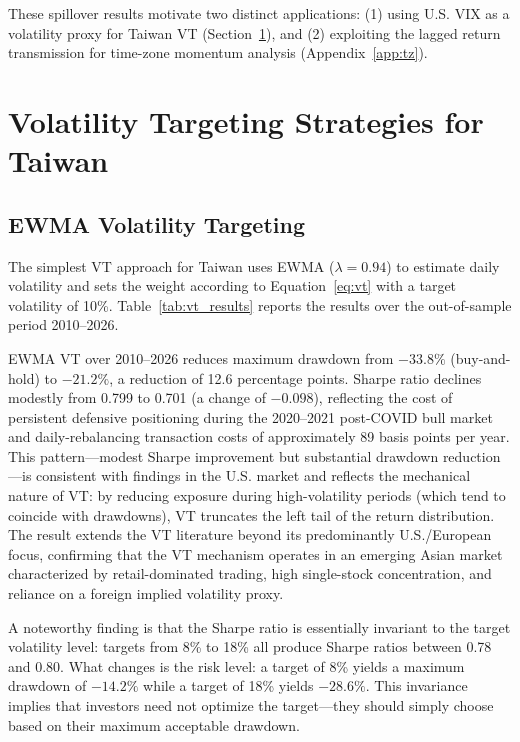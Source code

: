 These spillover results motivate two distinct applications: (1) using U.S. VIX as a volatility proxy for Taiwan VT (Section~\ref{sec:vt}), and (2) exploiting the lagged return transmission for time-zone momentum analysis (Appendix~\ref{app:tz}).



\section{Volatility Targeting Strategies for Taiwan}
\label{sec:vt}

\subsection{EWMA Volatility Targeting}

The simplest VT approach for Taiwan uses EWMA ($\lambda = 0.94$) to estimate daily volatility and sets the weight according to Equation~\eqref{eq:vt} with a target volatility of 10\%. Table~\ref{tab:vt_results} reports the results over the out-of-sample period 2010--2026.

EWMA VT over 2010--2026 reduces maximum drawdown from $-33.8\%$ (buy-and-hold) to $-21.2\%$, a reduction of 12.6 percentage points. Sharpe ratio declines modestly from 0.799 to 0.701 (a change of $-0.098$), reflecting the cost of persistent defensive positioning during the 2020--2021 post-COVID bull market and daily-rebalancing transaction costs of approximately 89 basis points per year. This pattern---modest Sharpe improvement but substantial drawdown reduction---is consistent with findings in the U.S. market \citep{moreira2017,harvey2018} and reflects the mechanical nature of VT: by reducing exposure during high-volatility periods (which tend to coincide with drawdowns), VT truncates the left tail of the return distribution. The result extends the VT literature beyond its predominantly U.S./European focus, confirming that the VT mechanism operates in an emerging Asian market characterized by retail-dominated trading, high single-stock concentration, and reliance on a foreign implied volatility proxy.

A noteworthy finding is that the Sharpe ratio is essentially invariant to the target volatility level: targets from 8\% to 18\% all produce Sharpe ratios between 0.78 and 0.80. What changes is the risk level: a target of 8\% yields a maximum drawdown of $-14.2\%$ while a target of 18\% yields $-28.6\%$. This invariance implies that investors need not optimize the target---they should simply choose based on their maximum acceptable drawdown.

